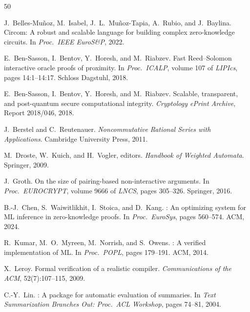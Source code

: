 \documentclass[11pt]{article}
\begin{document}
\begin{thebibliography}{50}

J.~Belles-Mu\~noz, M.~Isabel, J.~L.~Mu\~noz-Tapia, A.~Rubio, and
J.~Baylina.
\newblock Circom: A robust and scalable language for building complex
  zero-knowledge circuits.
\newblock In \emph{Proc.\ IEEE EuroS\&P}, 2022.

E.~Ben-Sasson, I.~Bentov, Y.~Horesh, and M.~Riabzev.
\newblock Fast {R}eed--{S}olomon interactive oracle proofs of proximity.
\newblock In \emph{Proc.\ ICALP}, volume 107 of \emph{LIPIcs}, pages
  14:1--14:17. Schloss Dagstuhl, 2018.

E.~Ben-Sasson, I.~Bentov, Y.~Horesh, and M.~Riabzev.
\newblock Scalable, transparent, and post-quantum secure computational
  integrity.
\newblock \emph{Cryptology ePrint Archive}, Report 2018/046, 2018.

J.~Berstel and C.~Reutenauer.
\newblock \emph{Noncommutative Rational Series with Applications}.
\newblock Cambridge University Press, 2011.

M.~Droste, W.~Kuich, and H.~Vogler, editors.
\newblock \emph{Handbook of Weighted Automata}.
\newblock Springer, 2009.

J.~Groth.
\newblock On the size of pairing-based non-interactive arguments.
\newblock In \emph{Proc.\ EUROCRYPT}, volume 9666 of \emph{LNCS}, pages
  305--326. Springer, 2016.

B.-J.~Chen, S.~Waiwitlikhit, I.~Stoica, and D.~Kang.
: An optimizing system for {ML} inference in zero-knowledge
  proofs.
\newblock In \emph{Proc.\ EuroSys}, pages 560--574. ACM, 2024.

R.~Kumar, M.~O.~Myreen, M.~Norrish, and S.~Owens.
: A verified implementation of {ML}.
\newblock In \emph{Proc.\ POPL}, pages 179--191. ACM, 2014.

X.~Leroy.
\newblock Formal verification of a realistic compiler.
\newblock \emph{Communications of the ACM}, 52(7):107--115, 2009.

C.-Y.~Lin.
: A package for automatic evaluation of summaries.
\newblock In \emph{Text Summarization Branches Out: Proc.\ ACL Workshop},
  pages 74--81, 2004.


\end{thebibliography}
\end{document}
